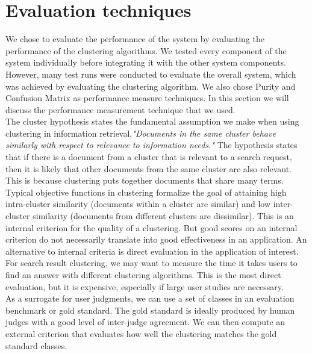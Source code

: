 \section{Evaluation techniques}\label{sec:tech}
We chose to evaluate the performance of the system by evaluating the performance of the clustering algorithms. We tested every component of the system individually before integrating it with the other system components. However, many test runs were conducted to evaluate the overall system, which was achieved by evaluating the clustering algorithm. We also chose Purity and Confusion Matrix as performance measure techniques. In this section we will discuss the performance measurement technique that we used. \\
The cluster hypothesis states the fundamental assumption we make when using clustering in information retrieval,\textit{"Documents in the same cluster behave similarly with respect to relevance to information needs."} The hypothesis states that if there is a document from a cluster that is relevant to a search request, then it is likely that other documents from the same cluster are also relevant. This is because clustering puts together documents that share many terms.\\
Typical objective functions in clustering formalize the goal of attaining high intra-cluster similarity (documents within a cluster are similar) and low inter-cluster similarity (documents from different clusters are dissimilar). This is an internal criterion for the quality of a clustering. But good scores on an internal criterion do not necessarily translate into good effectiveness in an application. An alternative to internal criteria is direct evaluation in the application of interest. For search result clustering, we may want to measure the time it takes users to find an answer with different clustering algorithms. This is the most direct evaluation, but it is expensive, especially if large user studies are necessary.\\
As a surrogate for user judgments, we can use a set of classes in an evaluation benchmark or gold standard. The gold standard is ideally produced by human judges with a good level of inter-judge agreement. We can then compute an external criterion that evaluates how well the clustering matches the gold standard classes.\\

